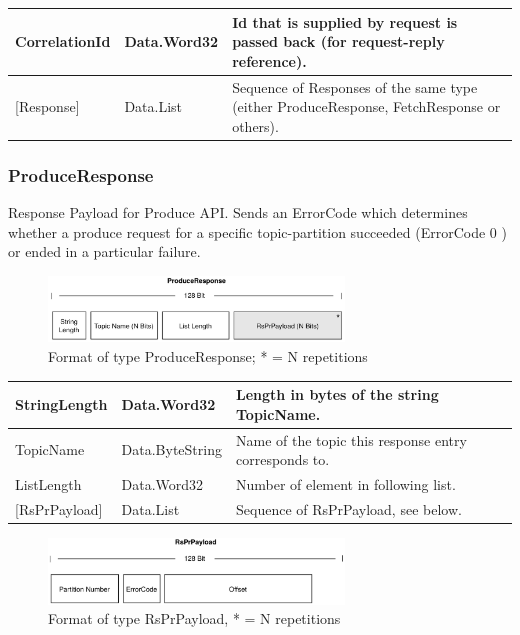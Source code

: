 \begin{table}[H]
\centering
\begin{tabular}{ l  l  p{10cm} }
\hline
CorrelationId  & Data.Word32 & Id that is supplied by request is passed back
(for request-reply reference).              \\ \hline
{[}Response{]} & Data.List   & Sequence of Responses of the same type (either
ProduceResponse, FetchResponse or others). \\ \hline
\end{tabular}
\end{table}


\subsubsection{ProduceResponse}
Response Payload for Produce API. Sends an ErrorCode which determines whether a
produce request for a specific topic-partition succeeded (ErrorCode 0 ) or ended
in a particular failure. 

\begin{figure}[H]
    \centering
    \includegraphics[width=0.7\textwidth]{images/impl-prot-types-produceResponse.png}
    \caption{Format of type ProduceResponse; * = N repetitions}
    \label{fig:impl-prot-types-produceResponse}
\end{figure}

\begin{table}[H]
\centering
\begin{tabular}{ l  l  p{10cm} }
\hline
StringLength      & Data.Word32     & Length in bytes of the string TopicName. \\ \hline
TopicName         & Data.ByteString & Name of the topic this response entry corresponds to.\\ \hline
ListLength        & Data.Word32     & Number of element in following list.\\ \hline
{[}RsPrPayload{]} & Data.List       & Sequence of RsPrPayload, see below.
\\ \hline
\end{tabular}
\end{table}

\begin{figure}[H]
    \centering
    \includegraphics[width=0.7\textwidth]{images/impl-prot-types-prPayload.png}
    \caption{Format of type RsPrPayload, * = N repetitions}
    \label{fig:impl-prot-types-prPayload}
\end{figure}



